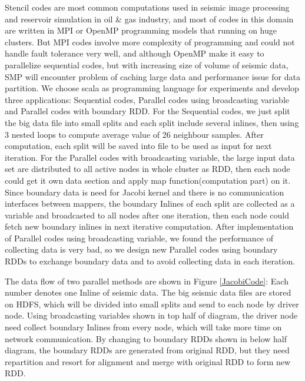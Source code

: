 Stencil codes are most common computations used in seismic image processing and reservoir simulation in oil \& gas industry, and most of codes in this domain are written in MPI or OpenMP programming models that running on huge clusters. But MPI codes involve more complexity of programming and could not handle fault tolerance very well, and although OpenMP make it easy to parallelize sequential codes, but with increasing size of volume of seismic data, SMP will encounter problem of caching large data and performance issue for data partition. 
We choose scala as programming language for experiments and develop three applications: Sequential codes, Parallel codes using broadcasting variable and Parallel codes with boundary RDD. For the Sequential codes, we just split the big data file into small splits and each split include several inlines, then using 3 nested loops to compute average value of 26 neighbour samples. After computation, each split will be saved into file to be used as input for next iteration. For the Parallel codes with broadcasting variable, the large input data set are distributed to all active nodes in whole cluster as RDD, then each node could get it own data section and apply map function(computation part) on it. Since boundary data is need for Jacobi kernel and there is no communication interfaces between mappers, the boundary Inlines of each split are collected as a variable and broadcasted to all nodes after one iteration, then each node could fetch new boundary inlines in next iterative computation. After implementation of Parallel codes using broadcasting variable, we found the performance of collecting data is very bad, so we design new Parallel codes using boundary RDDs to exchange boundary data and to avoid collecting data in each iteration. 

The data flow of two parallel methods are shown in Figure \ref{JacobiCode}: Each number denotes one Inline of seismic data. The big seismic data files are stored on HDFS, which will be divided into small splits and send to each node by driver node. Using broadcasting variables shown in top half of diagram, the driver node need collect boundary Inlines from every node, which will take more time on network communication. By changing to boundary RDDs shown in below half diagram, the boundary RDDs are generated from original RDD, but they need repartition and resort for alignment and merge with original RDD to form new RDD.

